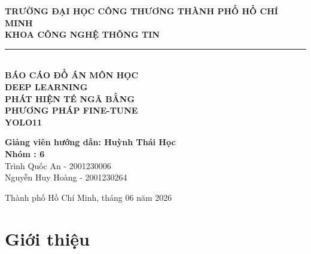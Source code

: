 \documentclass[12pt, a4paper]{article}
\begin{document}
\hypersetup{pageanchor=false}

\begin{titlepage}
  \centering
  \vspace*{1cm}

  {\Large \textbf{TRƯỜNG ĐẠI HỌC CÔNG THƯƠNG THÀNH PHỐ HỒ CHÍ MINH}}\\[0.3cm]
  {\large \textbf{KHOA CÔNG NGHỆ THÔNG TIN}}\\[0.5cm]
  \rule{\textwidth}{1.5pt}\\[0.5cm]

  \vspace{1.5cm}
  {\LARGE \textbf{BÁO CÁO ĐỒ ÁN MÔN HỌC}}\\[0.3cm]
  {\Large \textbf{DEEP LEARNING}}\\[2cm]

  {\huge \bfseries
PHÁT HIỆN TÉ NGÃ BẰNG\\[0.25cm]
PHƯƠNG PHÁP FINE-TUNE\\[0.25cm]
YOLO11\\[0.25cm]
}

  \vspace{2cm}
  \begin{flushright}
  \textbf{Giảng viên hướng dẫn: Huỳnh Thái Học}\\[0.8cm]
  \textbf{Nhóm : 6}\\[0.6cm]
  Trình Quốc An - 2001230006\\[0.4cm]
  Nguyễn Huy Hoàng - 2001230264\\[0.4cm]
  \end{flushright}

  \vfill
  {\large Thành phố Hồ Chí Minh, tháng 06 năm 2026}
\end{titlepage}

\hypersetup{pageanchor=true}

\tableofcontents
\newpage

\listoffigures
\listoftables
\newpage
{}

\section{Giới thiệu}
\end{document}
